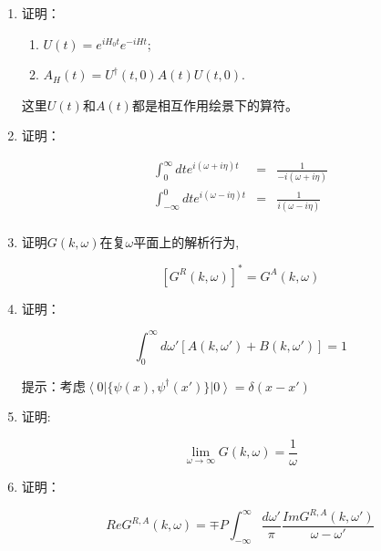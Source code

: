\begin{enumerate}

\item

证明：

\begin{enumerate}
\item 

$U(t) = e^{i H_0 t} e^{- i Ht}$; 

\item

$A_H (t) = U^\dagger (t,0) A(t) U(t,0)$.

\end{enumerate}

这里$U(t)$和$A(t)$都是相互作用绘景下的算符。

\item

证明：

\begin{eqnarray*}
\int_0^\infty  dt e^{i (\omega + i \eta) t} &=&  \frac{1}{-i (\omega + i \eta)}\\
\int_{-\infty}^0 dt e^{i (\omega - i \eta) t}  &=& \frac{1}{i (\omega - i \eta)} \\
\end{eqnarray*}


\item 证明$G(k, \omega)$在复$\omega$平面上的解析行为,

\begin{equation*}
\left[ G^R (k, \omega)  \right]^* = G^A (k, \omega)
\end{equation*}

\item 证明：

\begin{equation*}
\int_0^\infty d \omega' [A(k,\omega') + B(k, \omega')]  =1
\end{equation*}

提示：考虑$\left\langle 0 \right| \{  \psi(x), \psi^\dagger (x')  \}   \left| 0 \right\rangle = \delta(x-x') $

\item 证明:

\begin{equation*}
\lim_{\omega \to \infty } G(k,\omega) = \frac{1}{\omega}
\end{equation*}

\item 证明：

\begin{equation*}
Re G^{R,A}(k,\omega)=\mp P
\int_{-\infty}^{\infty}\frac{d\omega'}{\pi} \frac{ Im
G^{R,A}(k,\omega') }{\omega-\omega'}
\end{equation*}


\end{enumerate}